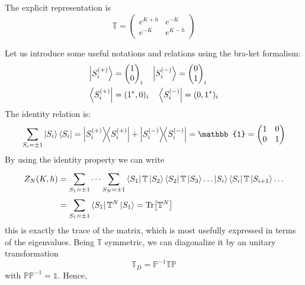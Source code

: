 \documentclass[../main/main.tex]{subfiles}
\begin{document}
The explicit representation is
\begin{equation}
  \mathbb{T} =
\begin{pmatrix}
e^{K+h}    & e^{-K}  \\
  e^{-K}  & e^{K-h}
\end{pmatrix}
\end{equation}

Let us introduce some useful notations and relations using the bra-ket formalism:
\begin{subequations}
\begin{align}
  \ket{S_i^{(+)}} &= \begin{pmatrix}
  1 \\
  0
  \end{pmatrix}_i
  \quad
  \ket{S_i^{(-)}} = \begin{pmatrix}
  0 \\
  1
  \end{pmatrix}_i   \\
  \bra{S_i^{(+)}} &= (1^*,0)_i \quad   \bra{S_i^{(-)}} = (0,1^*)_i
\end{align}
\end{subequations}
The identity relation is:
\begin{equation}
  \sum_{S_i = \pm 1}^{}  \ket{S_i} \bra{S_i} =
  \ketbra{S_i^{(+)}}{S_i^{(+)}} + \ketbra{S_i^{(-)}}{S_i^{(-)}}
  =\mathbb{1} = \begin{pmatrix}
  1   & 0 \\
  0   & 1
  \end{pmatrix}
\end{equation}
By using the identity property we can write
\begin{equation}
  \begin{split}
   Z_N (K,h) &= \sum_{S_1 = \pm 1}^{} \dots \sum_{S_N = \pm 1}^{} \bra{S_1} \mathbb{T} \ket{S_2} \bra{S_2}  \mathbb{T} \ket{S_3} \dots \ket{S_i} \bra{S_i}  \mathbb{T} \ket{S_{i+1}} \dots \\
   & = \sum_{S_1 = \pm 1}^{}  \bra{S_1}  \mathbb{T}^N \ket{S_1} = \Tr[\mathbb{T}^N]
     \end{split}
\end{equation}
this is exactly the trace of the matrix, which is most usefully expressed in terms of the eigenvalues. Being \( \mathbb{T} \) symmetric, we can diagonalize it by an unitary transformation
\begin{equation}
   \mathbb{T}_D = \mathbb{P}^{-1} \mathbb{T} \mathbb{P}
\end{equation}
with \( \mathbb{P} \mathbb{P}^{-1} = \mathbb{1} \). Hence,
\end{document}

